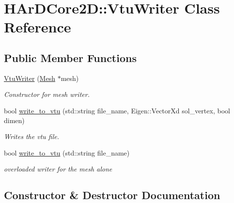 \hypertarget{classHArDCore2D_1_1VtuWriter}{}\section{H\+Ar\+D\+Core2D\+:\+:Vtu\+Writer Class Reference}
\label{classHArDCore2D_1_1VtuWriter}
\subsection*{Public Member Functions}
\begin{DoxyCompactItemize}
\item 
\hyperlink{classHArDCore2D_1_1VtuWriter_a6e7b1979b243145647b544b680a85b7d}{Vtu\+Writer} (\hyperlink{classHArDCore2D_1_1Mesh}{Mesh} $\ast$mesh)
\begin{DoxyCompactList}\small\item\em Constructor for mesh writer. \end{DoxyCompactList}\item 
bool \hyperlink{classHArDCore2D_1_1VtuWriter_abbbc4aff8486550827a70b4f8ad404cc}{write\+\_\+to\+\_\+vtu} (std\+::string file\+\_\+name, Eigen\+::\+Vector\+Xd sol\+\_\+vertex, bool dimen)
\begin{DoxyCompactList}\small\item\em Writes the vtu file. \end{DoxyCompactList}\item 
\mbox{\label{classHArDCore2D_1_1VtuWriter_aaf75193eddca3a0d369ad71c10c2be68}} 
bool \hyperlink{classHArDCore2D_1_1VtuWriter_aaf75193eddca3a0d369ad71c10c2be68}{write\+\_\+to\+\_\+vtu} (std\+::string file\+\_\+name)
\begin{DoxyCompactList}\small\item\em overloaded writer for the mesh alone \end{DoxyCompactList}\end{DoxyCompactItemize}


\subsection{Constructor \& Destructor Documentation}
\mbox{\label{classHArDCore2D_1_1VtuWriter_a6e7b1979b243145647b544b680a85b7d}} 
